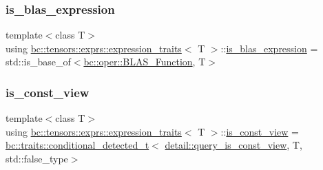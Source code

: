 \mbox{\label{structbc_1_1tensors_1_1exprs_1_1expression__traits_a09c158f1e3caf8a09be668795c294aed}} 
\subsubsection{\texorpdfstring{is\+\_\+blas\+\_\+expression}{is\_blas\_expression}}
{\footnotesize\ttfamily template$<$class T$>$ \\
using \hyperlink{structbc_1_1tensors_1_1exprs_1_1expression__traits}{bc\+::tensors\+::exprs\+::expression\+\_\+traits}$<$ T $>$\+::\hyperlink{structbc_1_1tensors_1_1exprs_1_1expression__traits_a09c158f1e3caf8a09be668795c294aed}{is\+\_\+blas\+\_\+expression} =  std\+::is\+\_\+base\+\_\+of$<$\hyperlink{structbc_1_1oper_1_1BLAS__Function}{bc\+::oper\+::\+B\+L\+A\+S\+\_\+\+Function}, T$>$}

\mbox{\label{structbc_1_1tensors_1_1exprs_1_1expression__traits_a9542c99877b734bea43fe8e42b3d3c04}} 
\subsubsection{\texorpdfstring{is\+\_\+const\+\_\+view}{is\_const\_view}}
{\footnotesize\ttfamily template$<$class T$>$ \\
using \hyperlink{structbc_1_1tensors_1_1exprs_1_1expression__traits}{bc\+::tensors\+::exprs\+::expression\+\_\+traits}$<$ T $>$\+::\hyperlink{structbc_1_1tensors_1_1exprs_1_1expression__traits_a9542c99877b734bea43fe8e42b3d3c04}{is\+\_\+const\+\_\+view} =  \hyperlink{namespacebc_1_1traits_a1a6d378947ec32acd457890854bcd592}{bc\+::traits\+::conditional\+\_\+detected\+\_\+t}$<$ \hyperlink{namespacebc_1_1tensors_1_1exprs_1_1detail_a701fb55d84ce81a94fc5552092b64138}{detail\+::query\+\_\+is\+\_\+const\+\_\+view}, T, std\+::false\+\_\+type$>$}

